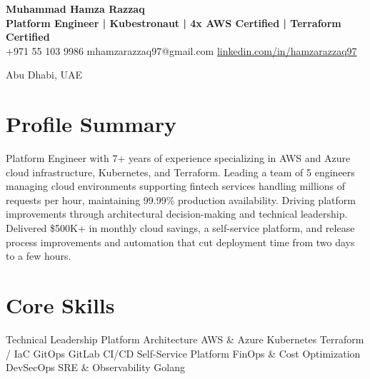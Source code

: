 \documentclass[11pt,a4paper,sans]{moderncv}
\begin{document}
\vspace*{-10mm}
{\centering
{\Huge\bfseries Muhammad Hamza Razzaq}\\[4pt]
\textbf{Platform Engineer | Kubestronaut | 4x AWS Certified | Terraform Certified}\\[4pt]
\textbullet\enspace +971 55 103 9986 \enspace\textbullet\enspace mhamzarazzaq97@gmail.com \enspace\textbullet\enspace \href{https://linkedin.com/in/hamzarazzaq97}{linkedin.com/in/hamzarazzaq97}
\par\vspace{3pt}
Abu Dhabi, UAE
\par}

\section{Profile Summary}
Platform Engineer with 7+ years of experience specializing in AWS and Azure cloud infrastructure, Kubernetes, and Terraform. Leading a team of 5 engineers managing cloud environments supporting fintech services handling millions of requests per hour, maintaining 99.99\% production availability. Driving platform improvements through architectural decision-making and technical leadership. Delivered \$500K+ in monthly cloud savings, a self-service platform, and release process improvements and automation that cut deployment time from two days to a few hours.

\section{Core Skills}
Technical Leadership \textbullet{} Platform Architecture \textbullet{} AWS \& Azure \textbullet{} Kubernetes \textbullet{} Terraform / IaC \textbullet{} GitOps \textbullet{} GitLab CI/CD \textbullet{} Self-Service Platform \textbullet{} FinOps \& Cost Optimization \textbullet{} DevSecOps \textbullet{} SRE \& Observability \textbullet{} Golang
\end{document}
